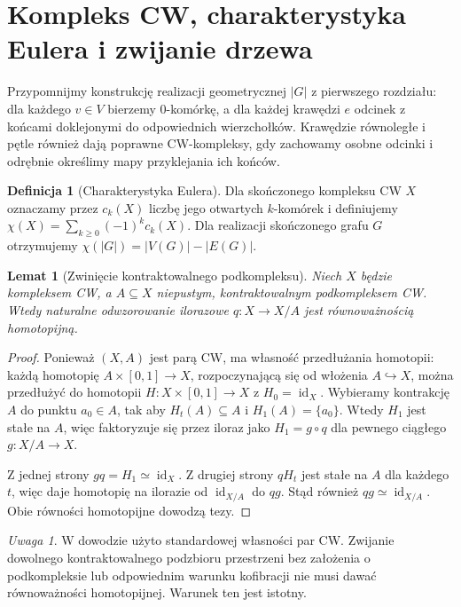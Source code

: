 \documentclass[11pt,a4paper]{report}
\numberwithin{equation}{section}
\theoremstyle{plain}
\newtheorem{lemat}[twierdzenie]{Lemat}
\theoremstyle{definition}
\newtheorem{definicja}[twierdzenie]{Definicja}
\theoremstyle{remark}
\newtheorem{uwaga}[twierdzenie]{Uwaga}
\begin{document}
\section{Kompleks CW, charakterystyka Eulera i zwijanie drzewa}
\label{sec:tg-collapse-tree}

Przypomnijmy konstrukcję realizacji geometrycznej $|G|$
z pierwszego rozdziału: dla każdego $v\in V$ bierzemy
$0$-komórkę, a dla każdej krawędzi $e$ odcinek z końcami
doklejonymi do odpowiednich wierzchołków. Krawędzie
równoległe i pętle również dają poprawne CW-kompleksy,
gdy zachowamy osobne odcinki i odrębnie określimy mapy
przyklejania ich końców.

\begin{definicja}[Charakterystyka Eulera]
Dla skończonego kompleksu CW $X$ oznaczamy przez $c_k(X)$
liczbę jego otwartych $k$-komórek i definiujemy
$\chi(X)=\sum_{k\ge0}(-1)^k c_k(X)$.
Dla realizacji skończonego grafu $G$ otrzymujemy
$\chi(|G|)=|V(G)|-|E(G)|$.
\end{definicja}

\begin{lemat}[Zwinięcie kontraktowalnego podkompleksu]
\label{lem:tg-collapse-CW}
Niech $X$ będzie kompleksem CW, a $A\subseteq X$
niepustym, kontraktowalnym podkompleksem CW.
Wtedy naturalne odwzorowanie ilorazowe $q:X\to X/A$
jest równoważnością homotopijną.
\end{lemat}

\begin{proof}
Ponieważ $(X,A)$ jest parą CW, ma własność przedłużania
homotopii: każdą homotopię $A\times[0,1]\to X$,
rozpoczynającą się od włożenia $A\hookrightarrow X$,
można przedłużyć do homotopii $H:X\times[0,1]\to X$
z $H_0=\operatorname{id}_X$. Wybieramy kontrakcję
$A$ do punktu $a_0\in A$, tak aby $H_t(A)\subseteq A$
i $H_1(A)=\{a_0\}$. Wtedy $H_1$ jest stałe na $A$,
więc faktoryzuje się przez iloraz jako $H_1=g\circ q$
dla pewnego ciągłego $g:X/A\to X$.

Z jednej strony $gq=H_1\simeq\operatorname{id}_X$.
Z drugiej strony $qH_t$ jest stałe na $A$ dla każdego $t$,
więc daje homotopię na ilorazie od
$\operatorname{id}_{X/A}$ do $qg$.
Stąd również $qg\simeq\operatorname{id}_{X/A}$.
Obie równości homotopijne dowodzą tezy.
\end{proof}

\begin{uwaga}
W dowodzie użyto standardowej własności par CW.
Zwijanie dowolnego kontraktowalnego podzbioru przestrzeni
bez założenia o podkompleksie lub odpowiednim warunku
kofibracji nie musi dawać równoważności homotopijnej. Warunek ten jest istotny.
\end{uwaga}
\end{document}
